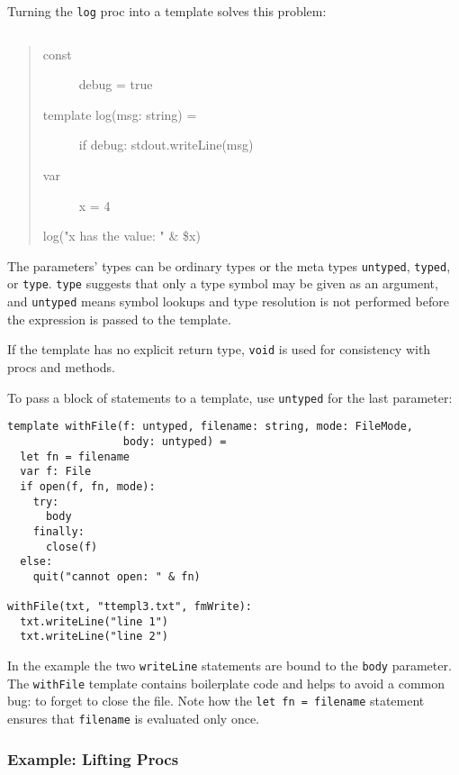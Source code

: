 Turning the \texttt{log} proc into a template solves this problem:

\begin{verbatim}
\end{verbatim}

\begin{quote}
\begin{description}
\item[const]
debug = true
\item[template log(msg: string) =]
if debug: stdout.writeLine(msg)
\item[var]
x = 4
\end{description}

log("x has the value: " \& \$x)
\end{quote}

The parameters' types can be ordinary types or the meta types
\texttt{untyped}, \texttt{typed}, or \texttt{type}. \texttt{type}
suggests that only a type symbol may be given as an argument, and
\texttt{untyped} means symbol lookups and type resolution is not
performed before the expression is passed to the template.

If the template has no explicit return type, \texttt{void} is used for
consistency with procs and methods.

To pass a block of statements to a template, use \texttt{untyped} for
the last parameter:

\begin{verbatim}
template withFile(f: untyped, filename: string, mode: FileMode,
                  body: untyped) =
  let fn = filename
  var f: File
  if open(f, fn, mode):
    try:
      body
    finally:
      close(f)
  else:
    quit("cannot open: " & fn)

withFile(txt, "ttempl3.txt", fmWrite):
  txt.writeLine("line 1")
  txt.writeLine("line 2")
\end{verbatim}

In the example the two \texttt{writeLine} statements are bound to the
\texttt{body} parameter. The \texttt{withFile} template contains
boilerplate code and helps to avoid a common bug: to forget to close the
file. Note how the \texttt{let\ fn\ =\ filename} statement ensures that
\texttt{filename} is evaluated only once.

\hypertarget{example-lifting-procs}{%
\subsubsection{Example: Lifting Procs}\label{example-lifting-procs}}

